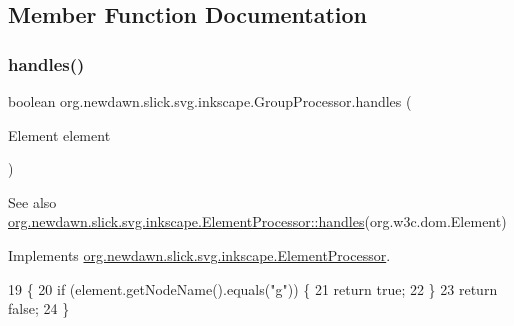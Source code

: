 \subsection{Member Function Documentation}
\mbox{\label{classorg_1_1newdawn_1_1slick_1_1svg_1_1inkscape_1_1_group_processor_a870dccc7ed743d7d2456575009813c75}} 
\subsubsection{\texorpdfstring{handles()}{handles()}}
{\footnotesize\ttfamily boolean org.\+newdawn.\+slick.\+svg.\+inkscape.\+Group\+Processor.\+handles (\begin{DoxyParamCaption}\item[{Element}]{element }\end{DoxyParamCaption})\hspace{0.3cm}{\ttfamily [inline]}}

\begin{DoxySeeAlso}{See also}
\mbox{\hyperlink{interfaceorg_1_1newdawn_1_1slick_1_1svg_1_1inkscape_1_1_element_processor_ae95bbf21a67c52aff02cf09259c554a3}{org.\+newdawn.\+slick.\+svg.\+inkscape.\+Element\+Processor\+::handles}}(org.\+w3c.\+dom.\+Element) 
\end{DoxySeeAlso}


Implements \mbox{\hyperlink{interfaceorg_1_1newdawn_1_1slick_1_1svg_1_1inkscape_1_1_element_processor_ae95bbf21a67c52aff02cf09259c554a3}{org.\+newdawn.\+slick.\+svg.\+inkscape.\+Element\+Processor}}.


\begin{DoxyCode}
19                                             \{
20         \textcolor{keywordflow}{if} (element.getNodeName().equals(\textcolor{stringliteral}{"g"})) \{
21             \textcolor{keywordflow}{return} \textcolor{keyword}{true};
22         \}
23         \textcolor{keywordflow}{return} \textcolor{keyword}{false};
24     \}
\end{DoxyCode}
\mbox{\label{classorg_1_1newdawn_1_1slick_1_1svg_1_1inkscape_1_1_group_processor_af3d842954b1ee338f5dc0bbca656e9b9}} 
